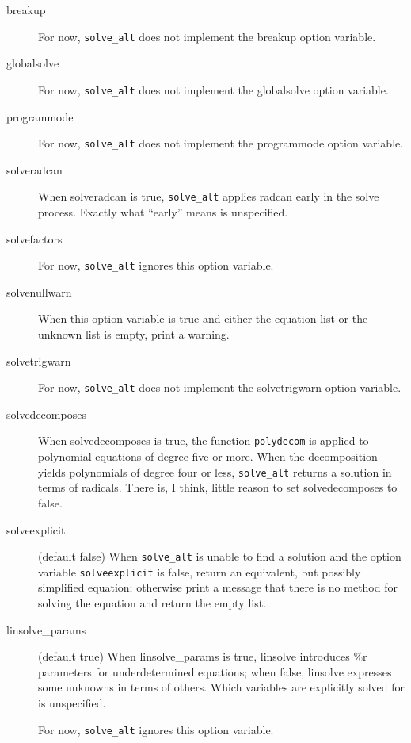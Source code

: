 \documentclass[]{scrartcl}
\newcommand{\altsolve}{\texttt{solve\_alt}}
\newcommand{\solveexplicit}{\texttt{solveexplicit}}
\begin{document}
\begin{description}

\item [breakup ] For now, \altsolve\/ does not implement the breakup option variable.

\item [globalsolve] For now, \altsolve\/ does not implement the globalsolve option variable.

\item [programmode] For now, \altsolve\/ does not implement the programmode option variable.

\item [solveradcan] When solveradcan is true, \altsolve\/ applies radcan early in the solve process.
      Exactly what ``early'' means is unspecified.

\item [solvefactors] For now, \altsolve\/ ignores this option variable.

\item [solvenullwarn] When this option variable is true and either the equation list or the unknown list is
empty, print a warning.

\item [solvetrigwarn] For now, \altsolve\/ does not implement the solvetrigwarn option variable.

\item [solvedecomposes] When solvedecomposes is true, the function \texttt{polydecom} is applied to
polynomial equations of degree five or more. When the decomposition yields polynomials of degree four
or less, \altsolve\/ returns a solution in terms of radicals. There is, I think, little reason to
set solvedecomposes to false.

\item [solveexplicit] (default false) When \altsolve\/  is unable to find a solution and the option variable \solveexplicit\/ is false, return an equivalent, but possibly simplified equation;  otherwise print a message that there is no method for solving the equation and return the empty list.

\item [linsolve\_params] (default true) When linsolve\_params is true, linsolve introduces \%r parameters for underdetermined equations; when false, linsolve expresses some unknowns in terms of others. Which variables are explicitly solved for is unspecified.

For now, \altsolve \/ ignores this option variable.


\end{description}
\end{document}
